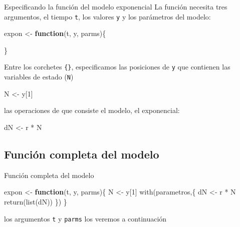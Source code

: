 \documentclass[
  11pt,
  ignorenonframetext,
]{beamer}
\newenvironment{Shaded}{}{}
\newcommand{\ControlFlowTok}[1]{\textcolor[rgb]{0.00,0.44,0.13}{\textbf{#1}}}
\newcommand{\DecValTok}[1]{\textcolor[rgb]{0.25,0.63,0.44}{#1}}
\newcommand{\FunctionTok}[1]{\textcolor[rgb]{0.02,0.16,0.49}{#1}}
\newcommand{\NormalTok}[1]{#1}
\newcommand{\OtherTok}[1]{\textcolor[rgb]{0.00,0.44,0.13}{#1}}
\newcommand{\SpecialCharTok}[1]{\textcolor[rgb]{0.25,0.44,0.63}{#1}}
\begin{document}
\begin{frame}[fragile]{Especificando la función del modelo exponencial}
La función necesita tres argumentos, el tiempo \texttt{t}, los valores
\texttt{y} y los parámetros del modelo:

\begin{Shaded}
\begin{Highlighting}[]
\NormalTok{expon }\OtherTok{\textless{}{-}} \ControlFlowTok{function}\NormalTok{(t, y, parms)\{}
  
\NormalTok{\}}
\end{Highlighting}
\end{Shaded}

Entre los corchetes \texttt{\{\}}, especificamos las posiciones de
\texttt{y} que contienen las variables de estado (\texttt{N})

\begin{Shaded}
\begin{Highlighting}[]
\NormalTok{N }\OtherTok{\textless{}{-}}\NormalTok{ y[}\DecValTok{1}\NormalTok{]}
\end{Highlighting}
\end{Shaded}

las operaciones de que consiste el modelo, el exponencial:

\begin{Shaded}
\begin{Highlighting}[]
\NormalTok{dN }\OtherTok{\textless{}{-}}\NormalTok{ r }\SpecialCharTok{*}\NormalTok{ N}
\end{Highlighting}
\end{Shaded}
\end{frame}

\hypertarget{funciuxf3n-completa-del-modelo}{%
\subsection{Función completa del
modelo}\label{funciuxf3n-completa-del-modelo}}

\begin{frame}[fragile]{Función completa del modelo}
\begin{Shaded}
\begin{Highlighting}[]
\NormalTok{expon }\OtherTok{\textless{}{-}} \ControlFlowTok{function}\NormalTok{(t, y, parms)\{}
\NormalTok{  N }\OtherTok{\textless{}{-}}\NormalTok{ y[}\DecValTok{1}\NormalTok{]}
  \FunctionTok{with}\NormalTok{(parametros,\{}
\NormalTok{    dN }\OtherTok{\textless{}{-}}\NormalTok{ r }\SpecialCharTok{*}\NormalTok{ N}
    \FunctionTok{return}\NormalTok{(}\FunctionTok{list}\NormalTok{(dN))}
\NormalTok{  \})}
\NormalTok{\}}
\end{Highlighting}
\end{Shaded}

los argumentos \texttt{t} y \texttt{parms} los veremos a continuación
\end{frame}
\end{document}
